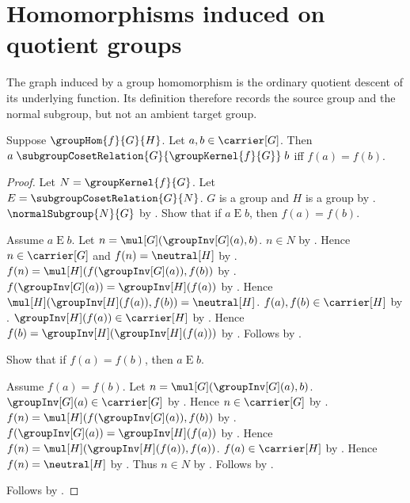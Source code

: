 


\section{Homomorphisms induced on quotient groups}

The graph induced by a group homomorphism is the ordinary quotient descent
of its underlying function.  Its definition therefore records the source
group and the normal subgroup, but not an ambient target group.

\begin{theorem}\label{group_hom_kernel_coset_relation_iff}
    Suppose $\groupHom{f}{G}{H}$.
    Let $a,b\in\carrier[G]$.
    Then
        $a\mathrel{
            \subgroupCosetRelation{G}{\groupKernel{f}{G}}}b$
        iff $f(a)=f(b)$.
\end{theorem}
\begin{proof}
    Let $N=\groupKernel{f}{G}$.
    Let $E=\subgroupCosetRelation{G}{N}$.
    $G$ is a group and $H$ is a group by
        .
    $\normalSubgroup{N}{G}$ by .
    Show that if $a\mathrel{E}b$, then $f(a)=f(b)$.
    \begin{subproof}
        Assume $a\mathrel{E}b$.
        Let $n=\mul[G](\groupInv[G](a),b)$.
        $n\in N$ by .
        Hence $n\in\carrier[G]$ and $f(n)=\neutral[H]$ by
            .
        $f(n)=\mul[H](f(\groupInv[G](a)),f(b))$ by
            .
        $f(\groupInv[G](a))=\groupInv[H](f(a))$ by
            .
        Hence
            $\mul[H](\groupInv[H](f(a)),f(b))=\neutral[H]$.
        $f(a),f(b)\in\carrier[H]$ by
            .
        $\groupInv[H](f(a))\in\carrier[H]$ by
            .
        Hence $f(b)=\groupInv[H](\groupInv[H](f(a)))$ by
            .
        Follows by .
    \end{subproof}
    Show that if $f(a)=f(b)$, then $a\mathrel{E}b$.
    \begin{subproof}
        Assume $f(a)=f(b)$.
        Let $n=\mul[G](\groupInv[G](a),b)$.
        $\groupInv[G](a)\in\carrier[G]$ by
            .
        Hence $n\in\carrier[G]$ by
            .
        $f(n)=\mul[H](f(\groupInv[G](a)),f(b))$ by
            .
        $f(\groupInv[G](a))=\groupInv[H](f(a))$ by
            .
        Hence
            $f(n)=\mul[H](\groupInv[H](f(a)),f(a))$.
        $f(a)\in\carrier[H]$ by .
        Hence $f(n)=\neutral[H]$ by .
        Thus $n\in N$ by .
        Follows by .
    \end{subproof}
    Follows by \auto.
\end{proof}

